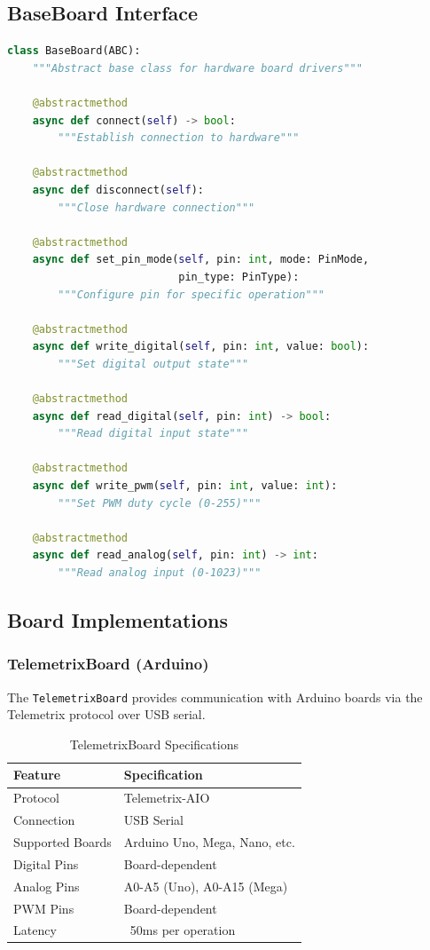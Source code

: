 \documentclass[11pt,a4paper]{article}
\begin{document}
\subsection{BaseBoard Interface}

\begin{lstlisting}[language=Python]
class BaseBoard(ABC):
    """Abstract base class for hardware board drivers"""

    @abstractmethod
    async def connect(self) -> bool:
        """Establish connection to hardware"""

    @abstractmethod
    async def disconnect(self):
        """Close hardware connection"""

    @abstractmethod
    async def set_pin_mode(self, pin: int, mode: PinMode,
                           pin_type: PinType):
        """Configure pin for specific operation"""

    @abstractmethod
    async def write_digital(self, pin: int, value: bool):
        """Set digital output state"""

    @abstractmethod
    async def read_digital(self, pin: int) -> bool:
        """Read digital input state"""

    @abstractmethod
    async def write_pwm(self, pin: int, value: int):
        """Set PWM duty cycle (0-255)"""

    @abstractmethod
    async def read_analog(self, pin: int) -> int:
        """Read analog input (0-1023)"""
\end{lstlisting}

\subsection{Board Implementations}

\subsubsection{TelemetrixBoard (Arduino)}

The \texttt{TelemetrixBoard} provides communication with Arduino boards via the Telemetrix protocol over USB serial.

\begin{table}[H]
\centering
\begin{tabular}{@{}ll@{}}
\toprule
\textbf{Feature} & \textbf{Specification} \\
\midrule
Protocol & Telemetrix-AIO \\
Connection & USB Serial \\
Supported Boards & Arduino Uno, Mega, Nano, etc. \\
Digital Pins & Board-dependent \\
Analog Pins & A0-A5 (Uno), A0-A15 (Mega) \\
PWM Pins & Board-dependent \\
Latency & ~50ms per operation \\
\bottomrule
\end{tabular}
\caption{TelemetrixBoard Specifications}
\end{table}
\end{document}
